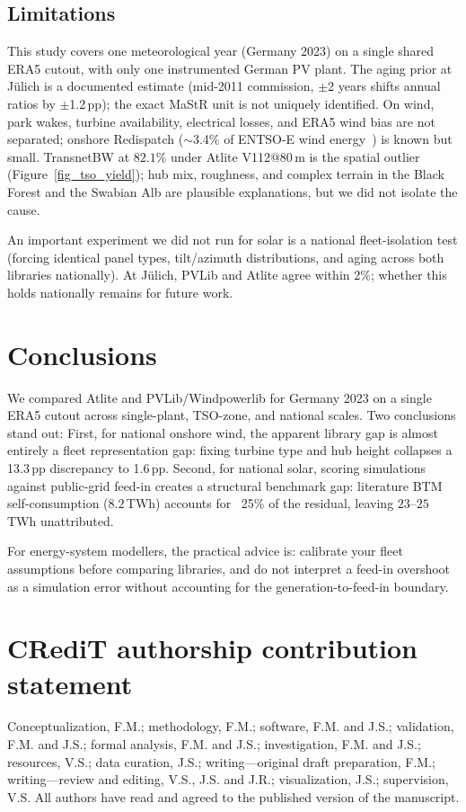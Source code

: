 \documentclass[preprint,12pt,number]{elsarticle}
\begin{document}
\subsection{Limitations}
\label{sec:limitations}

This study covers one meteorological year (Germany 2023) on a single shared ERA5 cutout, with only one instrumented German PV plant.
The aging prior at Jülich is a documented estimate (mid-2011 commission, $\pm$2 years shifts annual ratios by $\pm$1.2\,pp); the exact MaStR unit is not uniquely identified.
On wind, park wakes, turbine availability, electrical losses, and ERA5 wind bias are not separated; onshore Redispatch ($\sim$3.4\% of ENTSO-E wind energy~\citep{SMARD2024Redispatch2023}) is known but small.
TransnetBW at $82.1\%$ under Atlite V112@80\,m is the spatial outlier (Figure~\ref{fig_tso_yield}); hub mix, roughness, and complex terrain in the Black Forest and the Swabian Alb are plausible explanations, but we did not isolate the cause.

An important experiment we did not run for solar is a national fleet-isolation test (forcing identical panel types, tilt/azimuth distributions, and aging across both libraries nationally). At Jülich, PVLib and Atlite agree within 2\%; whether this holds nationally remains for future work.

\section{Conclusions}
\label{sec:conclusions}

We compared Atlite and PVLib/Windpowerlib for Germany 2023 on a single ERA5 cutout across single-plant, TSO-zone, and national scales.
Two conclusions stand out:
First, for national onshore wind, the apparent library gap is almost entirely a fleet representation gap: fixing turbine type and hub height collapses a 13.3\,pp discrepancy to 1.6\,pp.
Second, for national solar, scoring simulations against public-grid feed-in creates a structural benchmark gap: literature BTM self-consumption ($8.2$\,TWh) accounts for ~25\% of the residual, leaving $23\text{--}25$\,TWh unattributed.

For energy-system modellers, the practical advice is: calibrate your fleet assumptions before comparing libraries, and do not interpret a feed-in overshoot as a simulation error without accounting for the generation-to-feed-in boundary.

\section*{CRediT authorship contribution statement}
Conceptualization, F.M.; methodology, F.M.; software, F.M. and J.S.; validation, F.M. and J.S.; formal analysis, F.M. and J.S.; investigation, F.M. and J.S.; resources, V.S.; data curation, J.S.; writing---original draft preparation, F.M.; writing---review and editing, V.S., J.S. and J.R.; visualization, J.S.; supervision, V.S.
All authors have read and agreed to the published version of the manuscript.
\end{document}
